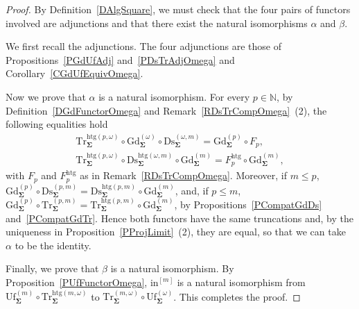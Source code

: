 \documentclass[a4paper, reqno]{amsbook}
\newcommand{\sig}[1]{\mathbf{#1}}             %
\newcommand{\htg}{\mathrm{htg}}                %
\newcommand{\Gd}{\mathrm{Gd}}
\newcommand{\Uf}{\mathrm{Uf}}
\newcommand{\Ds}{\mathrm{Ds}}
\newcommand{\Tr}{\mathrm{Tr}}
\theoremstyle{plain}
\theoremstyle{definition}
\begin{document}
\begin{proof}
By Definition~\ref{DAlgSquare}, we must check that the four pairs of functors involved are adjunctions and that there exist the natural isomorphisms $\alpha$ and $\beta$.

We first recall the adjunctions.
The four adjunctions are those of Propositions~\ref{PGdUfAdj} and~\ref{PDsTrAdjOmega} and Corollary~\ref{CGdUfEquivOmega}.

Now we prove that $\alpha$ is a natural isomorphism.
For every $p\in\mathbb{N}$, by Definition~\ref{DGdFunctorOmega} and Remark~\ref{RDsTrCompOmega}~(2), the following equalities hold
\begin{gather*}
\Tr^{\htg(p,\omega)}_{\sig{\Sigma}}\circ\Gd^{(\omega)}_{\sig{\Sigma}}\circ\Ds^{(\omega,m)}_{\sig{\Sigma}}=\Gd^{(p)}_{\sig{\Sigma}}\circ F_{p},\\
\Tr^{\htg(p,\omega)}_{\sig{\Sigma}}\circ\Ds^{\htg(\omega,m)}_{\sig{\Sigma}}\circ\Gd^{(m)}_{\sig{\Sigma}}=F^{\htg}_{p}\circ\Gd^{(m)}_{\sig{\Sigma}},
\end{gather*}
with $F_{p}$ and $F^{\htg}_{p}$ as in Remark~\ref{RDsTrCompOmega}.
Moreover, if $m\leq p$, $\Gd^{(p)}_{\sig{\Sigma}}\circ\Ds^{(p,m)}_{\sig{\Sigma}}=\Ds^{\htg(p,m)}_{\sig{\Sigma}}\circ\Gd^{(m)}_{\sig{\Sigma}}$, and, if $p\leq m$, $\Gd^{(p)}_{\sig{\Sigma}}\circ \Tr^{(p,m)}_{\sig{\Sigma}}=\Tr^{\htg(p,m)}_{\sig{\Sigma}}\circ\Gd^{(m)}_{\sig{\Sigma}}$, by Propositions~\ref{PCompatGdDs} and~\ref{PCompatGdTr}.
Hence both functors have the same truncations and, by the uniqueness in Proposition~\ref{PProjLimit}~(2), they are equal, so that we can take $\alpha$ to be the identity.

Finally, we prove that $\beta$ is a natural isomorphism.
By Proposition~\ref{PUfFunctorOmega}, $\mathrm{in}^{[m]}$ is a natural isomorphism from $\Uf^{(m)}_{\sig{\Sigma}}\circ \Tr^{\htg(m,\omega)}_{\sig{\Sigma}}$ to $\Tr^{(m,\omega)}_{\sig{\Sigma}}\circ\Uf^{(\omega)}_{\sig{\Sigma}}$. This completes the proof.
\end{proof}
\end{document}
